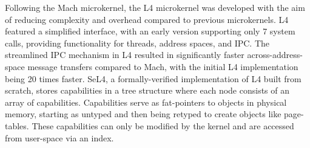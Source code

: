 Following the Mach microkernel, the L4 microkernel was developed with the aim of reducing complexity and 
overhead compared to previous microkernels. L4 featured a simplified interface, with an early version 
supporting only 7 system calls, providing functionality for threads, address spaces, and IPC. 
The streamlined IPC mechanism in L4 resulted in significantly faster across-address-space message transfers 
compared to Mach, with the initial L4 implementation being 20 times faster. SeL4, a formally-verified 
implementation of L4 built from scratch, stores capabilities in a tree structure where each node consists 
of an array of capabilities. Capabilities serve as fat-pointers to objects in physical memory, starting 
as untyped and then being retyped to create objects like page-tables. These capabilities can only be modified 
by the kernel and are accessed from user-space via an index.
\newline



